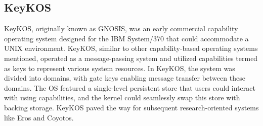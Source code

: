 \subsection{KeyKOS}
KeyKOS\cite{hardy_keykos_1985}, originally known as GNOSIS, was an early commercial capability operating system designed 
for the IBM System/370 that could accommodate a UNIX environment. KeyKOS, similar to other 
capability-based operating systems mentioned, operated as a message-passing system and 
utilized capabilities termed as keys to represent various system resources. In KeyKOS, 
the system was divided into domains, with gate keys enabling message transfer between 
these domains. The OS featured a single-level persistent store that users could interact 
with using capabilities, and the kernel could seamlessly swap this store with backing storage. 
KeyKOS paved the way for subsequent research-oriented systems like Eros and Coyotos.
\newline

